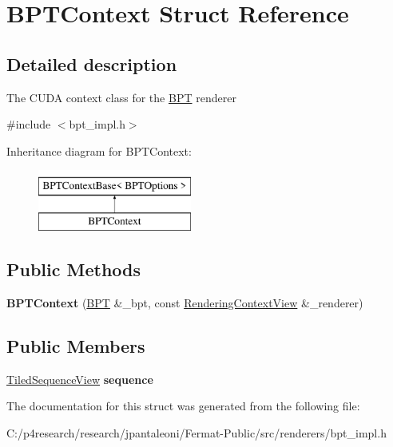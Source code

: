 \hypertarget{struct_b_p_t_context}{}\section{B\+P\+T\+Context Struct Reference}
\label{struct_b_p_t_context}


\subsection{Detailed description}
The C\+U\+DA context class for the \hyperlink{struct_b_p_t}{B\+PT} renderer 

{\ttfamily \#include $<$bpt\+\_\+impl.\+h$>$}

Inheritance diagram for B\+P\+T\+Context\+:\begin{figure}[H]
\begin{center}
\leavevmode
\includegraphics[height=2.000000cm]{struct_b_p_t_context}
\end{center}
\end{figure}
\subsection*{Public Methods}
\begin{DoxyCompactItemize}
\item 
\mbox{\label{struct_b_p_t_context_afcb37c3fb73082961daf6d8539d7c70e}} 
{\bfseries B\+P\+T\+Context} (\hyperlink{struct_b_p_t}{B\+PT} \&\+\_\+bpt, const \hyperlink{struct_rendering_context_view}{Rendering\+Context\+View} \&\+\_\+renderer)
\end{DoxyCompactItemize}
\subsection*{Public Members}
\begin{DoxyCompactItemize}
\item 
\mbox{\label{struct_b_p_t_context_af2ae399bb9eaafb80b03cdad9e1b804b}} 
\hyperlink{struct_tiled_sequence_view}{Tiled\+Sequence\+View} {\bfseries sequence}
\end{DoxyCompactItemize}


The documentation for this struct was generated from the following file\+:\begin{DoxyCompactItemize}
\item 
C\+:/p4research/research/jpantaleoni/\+Fermat-\/\+Public/src/renderers/bpt\+\_\+impl.\+h\end{DoxyCompactItemize}
